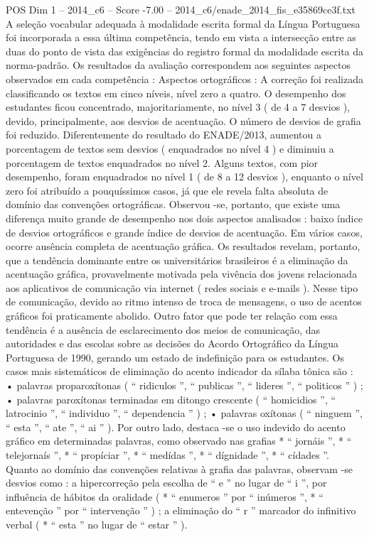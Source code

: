 \begin{textsample}{POS Dim 1 – 2014\_c6 – Score -7.00 – 2014\_c6/enade\_2014\_fis\_e35869ce3f.txt}
A seleção vocabular adequada à modalidade escrita formal da Língua Portuguesa foi incorporada a essa última competência, tendo em vista a intersecção entre as duas do ponto de vista das exigências do registro formal da modalidade escrita da norma-padrão.
Os resultados da avaliação correspondem aos seguintes aspectos observados em cada competência : Aspectos ortográficos : A correção foi realizada classificando os textos em cinco níveis, nível zero a quatro.
O desempenho dos estudantes ficou concentrado, majoritariamente, no nível 3 ( de 4 a 7 desvios ), devido, principalmente, aos desvios de acentuação.
O número de desvios de grafia foi reduzido.
Diferentemente do resultado do ENADE/2013, aumentou a porcentagem de textos sem desvios ( enquadrados no nível 4 ) e diminuiu a porcentagem de textos enquadrados no nível 2.
Alguns textos, com pior desempenho, foram enquadrados no nível 1 ( de 8 a 12 desvios ), enquanto o nível zero foi atribuído a pouquíssimos casos, já que ele revela falta absoluta de domínio das convenções ortográficas.
Observou -se, portanto, que existe uma diferença muito grande de desempenho nos dois aspectos analisados : baixo índice de desvios ortográficos e grande índice de desvios de acentuação.
Em vários casos, ocorre ausência completa de acentuação gráfica.
Os resultados revelam, portanto, que a tendência dominante entre os universitários brasileiros é a eliminação da acentuação gráfica, provavelmente motivada pela vivência dos jovens relacionada aos aplicativos de comunicação via internet ( redes sociais e e-mails ).
Nesse tipo de comunicação, devido ao ritmo intenso de troca de mensagens, o uso de acentos gráficos foi praticamente abolido.
Outro fator que pode ter relação com essa tendência é a ausência de esclarecimento dos meios de comunicação, das autoridades e das escolas sobre as decisões do Acordo Ortográfico da Língua Portuguesa de 1990, gerando um estado de indefinição para os estudantes.
Os casos mais sistemáticos de eliminação do acento indicador da sílaba tônica são : • palavras proparoxítonas ( “ ridiculos ”, “ publicas ”, “ lideres ”, “ politicos ” ) ; • palavras paroxítonas terminadas em ditongo crescente ( “ homicidios ”, “ latrocinio ”, “ individuo ”, “ dependencia ” ) ; • palavras oxítonas ( “ ninguem ”, “ esta ”, “ ate ”, “ ai ” ).
Por outro lado, destaca -se o uso indevido do acento gráfico em determinadas palavras, como observado nas grafias * “ jornáis ”, * “ telejornaís ”, * “ propíciar ”, * “ medídas ”, * “ dígnidade ”, * “ cídades ”.
Quanto ao domínio das convenções relativas à grafia das palavras, observam -se desvios como : a hipercorreção pela escolha de “ e ” no lugar de “ i ”, por influência de hábitos da oralidade ( * “ enumeros ” por “ inúmeros ”, * “ entevenção ” por “ intervenção ” ) ; a eliminação do “ r ” marcador do infinitivo verbal ( * “ esta ” no lugar de “ estar ” ).

\end{textsample}
